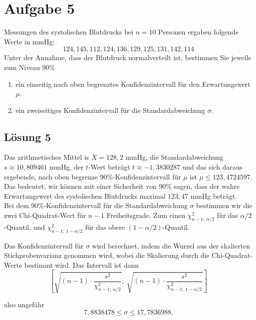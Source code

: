 \documentclass[main.tex]{subfiles}
\begin{document}
\section{Aufgabe 5}
Messungen des systolischen Blutdrucks bei $n = 10$ Personen ergaben folgende Werte in mmHg:
$$ 124, 145, 112, 124, 136, 129, 125, 131, 142, 114 $$
Unter der Annahme, dass der Blutdruck normalverteilt ist, bestimmen Sie jeweils zum Niveau $90\%$
\begin{enumerate}
	\item ein einseitig nach oben begrenztes Konfidenzintervall für den Erwartungswert $\mu$.
	\item ein zweiseitiges Konfidenzintervall für die Standardabweichung $\sigma$.
\end{enumerate}

\subsection{Lösung 5}
Das arithmetisches Mittel is $\bar{X} = 128,2$ mmHg, die Standardabweichung $s \approx 10,809461$ mmHg,
der $t$-Wert beträgt $t \approx - 1,3830287$ und das sich daraus ergebende, nach oben begrenze 90\%-Konfidenzintervall
für $\mu$ ist $\mu \leq 123,4724597$.
Das bedeutet, wir können mit einer Sicherheit von 90\% sagen, dass der wahre Erwartungswert des
systolischen Blutdrucks maximal $123,47$ mmHg beträgt.\\

Bei dem 90\%-Konfidenzintervall für die Standardabweichung $\sigma$ bestimmen wir die zwei Chi-Quadrat-Wert für $n-1$ Freiheitsgrade.
Zum einen $\chi^2_{n-1;\ \alpha/2}$ für das $\alpha / 2$-Quantil, und $\chi^2_{n-1;\ 1-\alpha/2}$ für das obere $(1-\alpha /2)$-Quantil.

Das Konfidenzintervall für $\sigma$ wird berechnet, indem die Wurzel aus der skalierten Stichprobenvarianz genommen wird, wobei die Skalierung durch die Chi-Quadrat-Werte bestimmt wird. Das Intervall ist dann
$$
	\left[
		\sqrt{(n-1) \cdot \frac{s^2}{\chi^2_{n-1;\ \alpha/2}}};\
		\sqrt{(n-1) \cdot \frac{s^2}{\chi^2_{n-1;\ 1-\alpha/2}}}
	\right]
$$

also ungefähr
$$
7,8838478 \leq \sigma \leq 17,7836988.
$$
\end{document}
